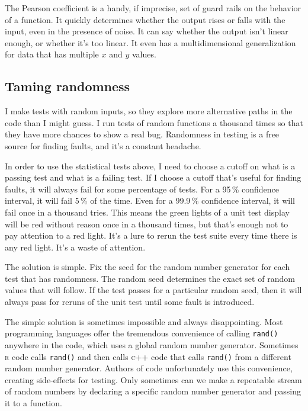 \documentclass[fleqn,10pt]{olplainarticle}
\newcommand{\rlang}{\textsc{r}\xspace}
\newcommand{\cpp}{\textsc{c}++\xspace}
\begin{document}
The Pearson coefficient is a handy, if imprecise,
set of guard rails on the behavior of a function.
It quickly determines whether the output rises or falls with the input,
even in the presence of noise. It can say whether the output
isn't linear enough, or whether it's too linear.
It even has a multidimensional generalization for data that
has multiple $x$ and $y$ values.


\subsection{Taming randomness}

I make tests with random inputs, so they explore more alternative
paths in the code than I might guess. I run tests of random
functions a thousand times so that they have more chances to
show a real bug. Randomness in testing is a free source for
finding faults, and it's a constant headache.

In order to use the statistical tests above, I need to choose
a cutoff on what is a passing test and what is a failing test.
If I choose a cutoff that's useful for finding faults, it will
always fail for some percentage of tests. For a 95\,\% confidence
interval, it will fail 5\,\% of the time. Even for a
99.9\,\% confidence interval, it will fail once in a thousand
tries. This means the green lights of a unit test display will
be red without reason once in a thousand times, but that's
enough not to pay attention to a red light. It's a lure to
rerun the test suite every time there is any red light.
It's a waste of attention.

The solution is simple. Fix the seed for the random number
generator for each test that has randomness. The random
seed determines the exact set of random values that will
follow. If the test passes for a particular random seed,
then it will always pass for reruns of the unit test until
some fault is introduced.

The simple solution is sometimes impossible and always
disappointing. Most programming languages offer the tremendous
convenience of calling \lstinline!rand()! anywhere in the
code, which uses a global random number generator. Sometimes
\rlang code calls \lstinline!rand()! and then calls \cpp code
that calls \lstinline!rand()! from a different random number
generator. Authors
of code unfortunately use this convenience, creating side-effects
for testing. Only sometimes can we make a repeatable
stream of random numbers by declaring a specific random number generator
and passing it to a function.
\end{document}
